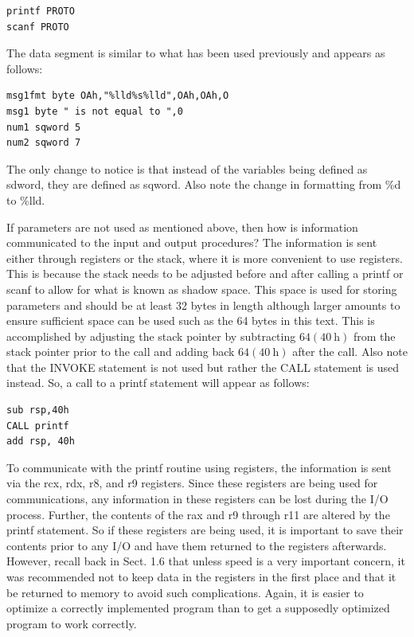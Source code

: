 \documentclass[10pt]{article}
\begin{document}
\begin{verbatim}
printf PROTO
scanf PROTO
\end{verbatim}

The data segment is similar to what has been used previously and appears as follows:

\begin{verbatim}
msg1fmt byte OAh,"%lld%s%lld",OAh,OAh,O
msg1 byte " is not equal to ",0
num1 sqword 5
num2 sqword 7
\end{verbatim}

The only change to notice is that instead of the variables being defined as sdword, they are defined as sqword. Also note the change in formatting from \%d to \%lld.

If parameters are not used as mentioned above, then how is information communicated to the input and output procedures? The information is sent either through registers or the stack, where it is more convenient to use registers. This is because the stack needs to be adjusted before and after calling a printf or scanf to allow for what is known as shadow space. This space is used for storing parameters and should be at least 32 bytes in length although larger amounts to ensure sufficient space can be used such as the 64 bytes in this text. This is accomplished by adjusting the stack pointer by subtracting $64(40 \mathrm{~h})$ from the stack pointer prior to the call and adding back $64(40 \mathrm{~h})$ after the call. Also note that the INVOKE statement is not used but rather the CALL statement is used instead. So, a call to a printf statement will appear as follows:

\begin{verbatim}
sub rsp,40h
CALL printf
add rsp, 40h
\end{verbatim}

To communicate with the printf routine using registers, the information is sent via the rcx, rdx, r8, and r9 registers. Since these registers are being used for communications, any information in these registers can be lost during the I/O process. Further, the contents of the rax and r9 through r11 are altered by the printf statement. So if these registers are being used, it is important to save their contents prior to any I/O and have them returned to the registers afterwards. However, recall back in Sect. 1.6 that unless speed is a very important concern, it was recommended not to keep data in the registers in the first place and that it be returned to memory to avoid such complications. Again, it is easier to optimize a correctly implemented program than to get a supposedly optimized program to work correctly.
\end{document}

